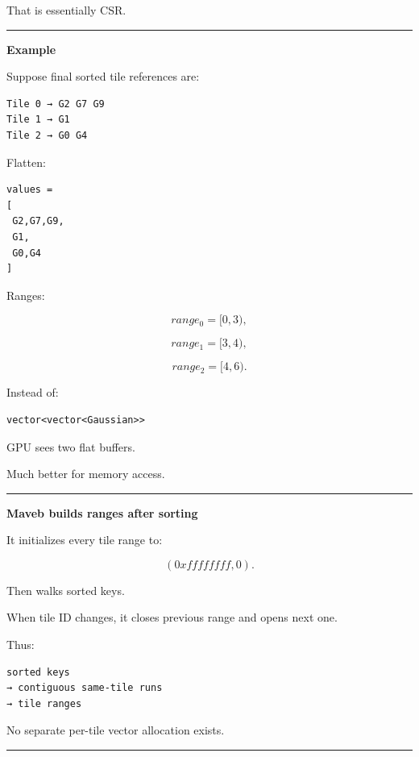 That is essentially CSR.

\begin{center}\rule{0.5\linewidth}{0.5pt}\end{center}

\textbf{Example}

Suppose final sorted tile references are:

\protect{}\label{usz654}%
\begin{verbatim}
Tile 0 → G2 G7 G9
Tile 1 → G1
Tile 2 → G0 G4
\end{verbatim}

Flatten:

\protect{}\label{m5jiq5}%
\begin{verbatim}
values =
[
 G2,G7,G9,
 G1,
 G0,G4
]
\end{verbatim}

Ranges:

\[
range_0=[0,3),
\]

\[
range_1=[3,4),
\]

\[
range_2=[4,6).
\]

Instead of:

\begin{verbatim}
vector<vector<Gaussian>>
\end{verbatim}

GPU sees two flat buffers.

Much better for memory access.

\begin{center}\rule{0.5\linewidth}{0.5pt}\end{center}

\textbf{Maveb builds ranges after sorting}

It initializes every tile range to:

\[
(0xffffffff,0).
\]

Then walks sorted keys.

When tile ID changes, it closes previous range and opens next one.

Thus:

\protect{}\label{sxtu5b}%
\begin{verbatim}
sorted keys
→ contiguous same-tile runs
→ tile ranges
\end{verbatim}

No separate per-tile vector allocation exists.

\begin{center}\rule{0.5\linewidth}{0.5pt}\end{center}

